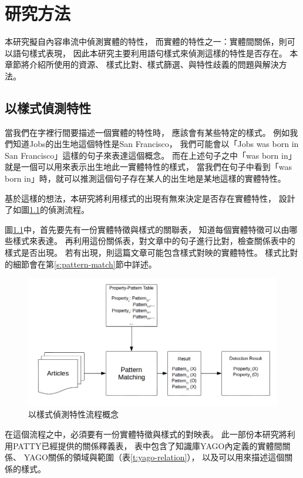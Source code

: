 %
%
%
\chapter{研究方法}
\label{c:method}

本研究擬自內容串流中偵測實體的特性，
而實體的特性之一：實體間關係，則可以語句樣式表現，
因此本研究主要利用語句樣式來偵測這樣的特性是否存在。
本章節將介紹所使用的資源、
樣式比對、樣式篩選、與特性歧義的問題與解決方法。

\section{以樣式偵測特性}
當我們在字裡行間要描述一個實體的特性時，
應該會有某些特定的樣式。
例如我們知道Jobs的出生地這個特性是San Francisco，
我們可能會以「Jobs was born in San Francisco」這樣的句子來表達這個概念。
而在上述句子之中「was born in」就是一個可以用來表示出生地此一實體特性的樣式，
當我們在句子中看到「was born in」時，就可以推測這個句子存在某人的出生地是某地這樣的實體特性。

基於這樣的想法，本研究將利用樣式的出現有無來決定是否存在實體特性，
設計了如圖\ref{i:process-v1}的偵測流程。

圖\ref{i:process-v1}中，首先要先有一份實體特徵與樣式的關聯表，
知道每個實體特徵可以由哪些樣式來表達。
再利用這份關係表，對文章中的句子進行比對，檢查關係表中的樣式是否出現。
若有出現，則這篇文章可能包含樣式對映的實體特性。
樣式比對的細節會在第\ref{s:pattern-match}節中詳述。

\begin{figure}
    \centering
    \includegraphics[width=1\textwidth]{images/03-process-v1}
    \caption{以樣式偵測特性流程概念}
    \label{i:process-v1}
\end{figure}

在這個流程之中，必須要有一份實體特徵與樣式的對映表。
此一部份本研究將利用PATTY已經提供的關係釋義表，
表中包含了知識庫YAGO內定義的實體間關係、
YAGO關係的領域與範圍（表\ref{t:yago-relation}），
以及可以用來描述這個關係的樣式。

